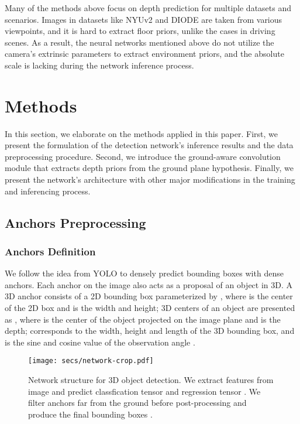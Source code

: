\documentclass[letterpaper, 10 pt, journal, twoside]{IEEEtran}
\begin{document}
Many of the methods above focus on depth prediction for multiple datasets and scenarios. Images in datasets like NYUv2\cite{SilbermanECCV12NYU} and DIODE\cite{diode_dataset} are taken from various viewpoints, and it is hard to extract floor priors, unlike the cases in driving scenes. As a result, the neural networks mentioned above do not utilize the camera's extrinsic parameters to extract environment priors, and the absolute scale is lacking during the network inference process.
 \section{Methods}
\label{section:Methods}


In this section, we elaborate on the methods applied in this paper. First, we present the formulation of the detection network's inference results and the data preprocessing procedure. 
Second, we introduce the ground-aware convolution module that extracts depth priors from the ground plane hypothesis.
Finally, we present the network's architecture with other major modifications in the training and inferencing process.

\subsection{Anchors Preprocessing}
\label{sec:anchor_method}
\subsubsection{Anchors Definition}

We follow the idea from YOLO \cite{yolov3} to densely predict bounding boxes with dense anchors.
Each anchor on the image also acts as a proposal of an object in 3D. A 3D anchor consists of a 2D bounding box
parameterized by , where  is the center of the 2D box and  is the width and height;
3D centers of an object are presented as , where  is the center of the object projected on the
image plane and  is the depth;  corresponds to the width, height and length of the 3D bounding box, and  is the sine and cosine value of the observation angle .

\begin{figure}
    \centering
        \texttt{[image: secs/network-crop.pdf]}

    \caption{Network structure for 3D object detection. We extract features from image  and predict classfication tensor  and regression tensor . We filter anchors far from the ground before post-processing and produce the final bounding boxes . 
    }
    \label{fig:network}
\end{figure} 
\end{document}
